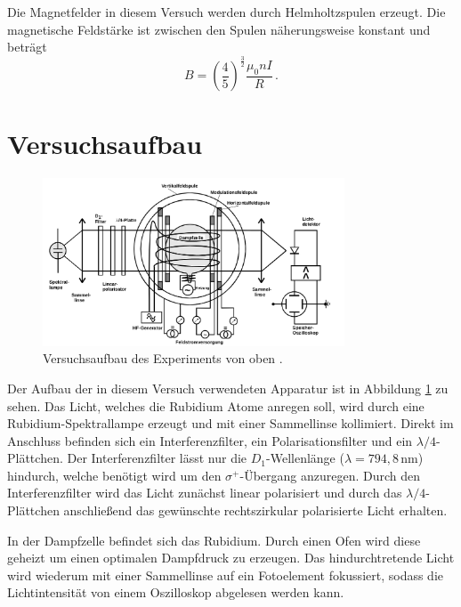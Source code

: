 Die Magnetfelder in diesem Versuch werden durch Helmholtzspulen erzeugt.
Die magnetische Feldstärke ist zwischen den Spulen näherungsweise konstant und beträgt
\begin{equation}
    \label{eq:helmholtz}
B= \left(\frac{4}{5}\right)^{\frac{3}{2}}\frac{\mu_0 n I}{R} \, .
\end{equation}

\newpage
\section{Versuchsaufbau}
\FloatBarrier
\begin{figure}[h]
    \centering
    \includegraphics[width=0.8\textwidth]{aufbau.png}
    \caption{Versuchsaufbau des Experiments von oben \cite{quelle01}.}
    \label{fig:tfig7}
\end{figure}
\FloatBarrier
\noindent
Der Aufbau der in diesem Versuch verwendeten Apparatur ist in Abbildung \ref{fig:tfig7} zu sehen.
Das Licht, welches die Rubidium Atome anregen soll, wird durch eine Rubidium-Spektrallampe erzeugt und mit einer Sammellinse kollimiert.
Direkt im Anschluss befinden sich ein Interferenzfilter, ein Polarisationsfilter und ein $\lambda/4$-Plättchen.
Der Interferenzfilter lässt nur die $D_1$-Wellenlänge ($\lambda = 794,8 \, \si{\nm}$) hindurch, welche benötigt wird um den $\sigma^{+}$-Übergang anzuregen.
Durch den Interferenzfilter wird das Licht zunächst linear polarisiert und durch das $\lambda/4$-Plättchen anschließend das gewünschte rechtszirkular polarisierte Licht erhalten.

In der Dampfzelle befindet sich das Rubidium.
Durch einen Ofen wird diese geheizt um einen optimalen Dampfdruck zu erzeugen.
Das hindurchtretende Licht wird wiederum mit einer Sammellinse auf ein Fotoelement fokussiert, sodass die Lichtintensität von einem Oszilloskop abgelesen werden kann.

